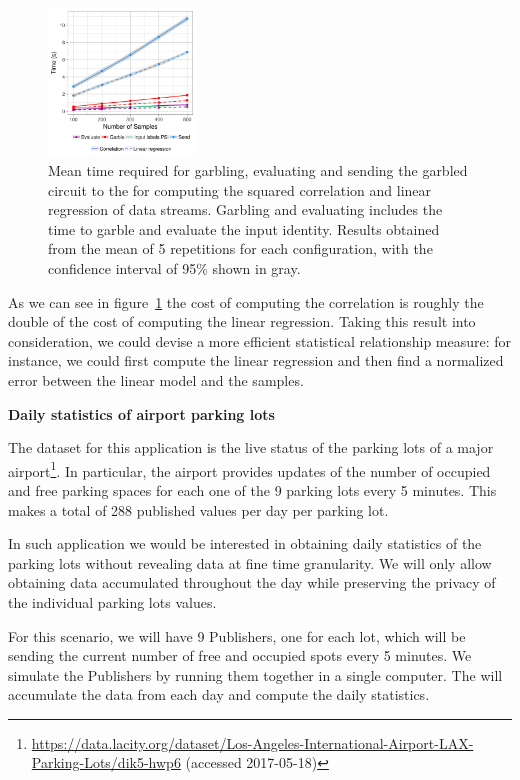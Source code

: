 \begin{figure}
  \includegraphics[width=0.35\textwidth]{plots/stream.png}
  \caption{Mean time required for garbling, evaluating and sending the garbled
    circuit to the \broker for computing the squared correlation and linear
    regression of data streams.  Garbling and evaluating includes the time to
    garble and evaluate the input identity.  Results obtained from the mean of
    5 repetitions for each configuration, with the confidence interval of 95\%
    shown in gray.}
  \label{stream-times}
\end{figure}

As we can see in figure~\ref{stream-times} the cost of computing the
correlation is roughly the double of the cost of computing the linear
regression.  Taking this result into consideration, we could devise a more
efficient statistical relationship measure: for instance, we could first
compute the linear regression and then find a normalized error between the
linear model and the samples.

\bigskip
\noindent\textbf{Daily statistics of airport parking lots}

The dataset for this application is the live status of the parking lots of a
major
airport\footnote{\url{https://data.lacity.org/dataset/Los-Angeles-International-Airport-LAX-Parking-Lots/dik5-hwp6}
(accessed 2017-05-18)}.  In particular, the airport provides updates of the
number of occupied and free parking spaces for each one of the 9 parking lots
every 5 minutes.  This makes a total of 288 published values per day per
parking lot.

In such application we would be interested in obtaining daily statistics of the
parking lots without revealing data at fine time granularity.  We will only
allow obtaining data accumulated throughout the day while preserving the
privacy of the individual parking lots values.

For this scenario, we will have 9 Publishers, one for each lot, which will be
sending the current number of free and occupied spots every 5 minutes.  We
simulate the Publishers by running them together in a single computer.  The
\broker will accumulate the data from each day and compute the daily statistics.

